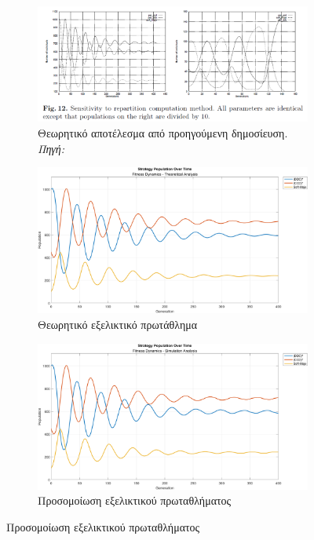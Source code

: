 \documentclass[12pt]{report}
\begin{document}
\begin{figure}[H]
    \centering

    \begin{subfigure}[b]{0.5\linewidth}
        \centering
        \includegraphics[width=\linewidth]{Figures Fitness Dynamics/12.png}
        \caption{Θεωρητικό αποτέλεσμα από προηγούμενη δημοσίευση. \textit{Πηγή:} \protect\cite{mathieu1999}}
        \label{fig:fig_fit_12_a}
    \end{subfigure}
    \hfill
    \begin{subfigure}[b]{0.5\linewidth}
        \centering
        \includegraphics[width=\linewidth]{Figures Fitness Dynamics/example12a.png}
        \caption{Θεωρητικό εξελικτικό πρωτάθλημα}
        \label{fig:fig_fit_12a_b}
    \end{subfigure}
    \hfill
    \begin{subfigure}[b]{0.5\linewidth}
        \centering
        \includegraphics[width=\linewidth]{Figures Fitness Dynamics/example12a-sim.png}
        \caption{Προσομοίωση εξελικτικού πρωταθλήματος}
        \label{fig:fig_fit_12a_c}
        

\end{subfigure}
\end{figure}
\end{document}
